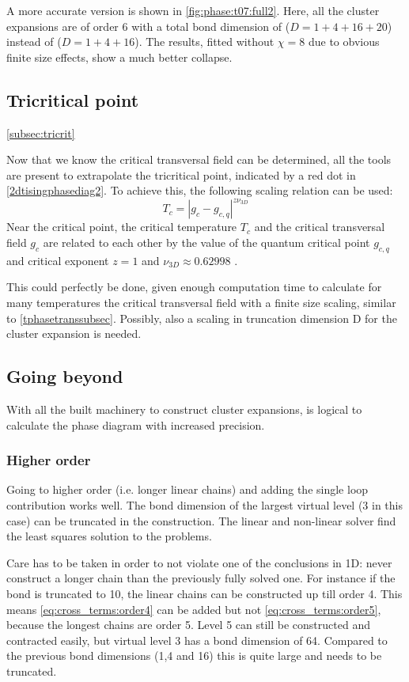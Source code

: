 A more accurate version is shown in \cref{fig:phase:t07:full2}. Here, all the cluster expansions are of order 6 with a total bond dimension of ($D = 1+4+16+20$) instead of ($D = 1+4+16$). The results, fitted without $\chi=8$ due to obvious finite size effects, show a much better collapse.

\subsection{Tricritical point}\cref{subsec:tricrit}

Now that we know the critical transversal field can be determined, all the tools are present to extrapolate the tricritical point, indicated by a red dot in \cref{2dtisingphasediag2}. To achieve this, the following scaling relation can be used:
\begin{equation}
    T_c = \left| g_c-g_{c,q} \right|^{z \nu_{3D}}
\end{equation}
Near the critical point, the critical temperature $T_c$ and the critical transversal field $g_c$ are related to each other by the value of the quantum critical point $g_{c,q}$ and critical exponent $z=1$ and $\nu_{3D} \approx 0.62998$ \cite{Hesselmann2016}.

This could perfectly be done, given enough computation time to calculate for many temperatures the critical transversal field with a finite size scaling, similar to \cref{tphasetranssubsec}. Possibly, also a scaling in truncation dimension D for the cluster expansion is needed.

\subsection{Going beyond}
With all the built machinery to construct cluster expansions, is logical to calculate the phase diagram with increased precision.

\subsubsection{Higher order}

Going to higher order (i.e. longer linear chains) and adding the single loop contribution works well. The bond dimension of the largest virtual level (3 in this case) can be truncated in the construction. The linear and non-linear solver find the least squares solution to the problems.

Care has to be taken in order to not violate one of the conclusions in 1D: never construct a longer chain than the previously fully solved one. For instance if the bond is truncated to 10, the linear chains can be constructed up till order 4. This means \cref{eq:cross_terms:order4} can be added but not \cref{eq:cross_terms:order5}, because the longest chains are order 5. Level 5 can still be constructed and contracted easily, but virtual level 3 has a bond dimension of 64. Compared to the previous bond dimensions (1,4 and 16) this is quite large and needs to be truncated.

